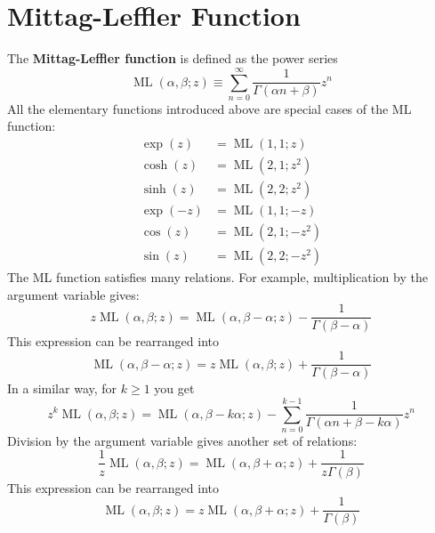 \section{Mittag-Leffler Function}
The \textbf{Mittag-Leffler function} is defined as the power series
\begin{equation}
	\operatorname{ML}(\alpha, \beta; z) \equiv \sum_{n = 0}^{\infty} \frac{1}{\Gamma(\alpha n + \beta)} z^{n}
\end{equation}
All the elementary functions introduced above are special cases of the ML function:
\begin{align}
	\exp(z)  & = \operatorname{ML}(1, 1; z)                 \\
	\cosh(z) & = \operatorname{ML}\left(2, 1; z^{2}\right)  \\
	\sinh(z) & = \operatorname{ML}\left(2, 2; z^{2}\right)  \\
	\exp(-z) & = \operatorname{ML}(1, 1; -z)                \\
	\cos(z)  & = \operatorname{ML}\left(2, 1; -z^{2}\right) \\
	\sin(z)  & = \operatorname{ML}\left(2, 2; -z^{2}\right)
\end{align}
The ML function satisfies many relations. For example, multiplication by the argument variable gives:
\begin{equation}
	z \operatorname{ML}(\alpha, \beta; z) = \operatorname{ML}(\alpha, \beta - \alpha; z) - \frac{1}{\Gamma(\beta - \alpha)}
\end{equation}
This expression can be rearranged into
\begin{equation}
	\operatorname{ML}(\alpha, \beta - \alpha; z) = z \operatorname{ML}(\alpha, \beta; z) + \frac{1}{\Gamma(\beta - \alpha)}
\end{equation}
In a similar way, for $k \geq 1$ you get
\begin{equation}
	z^{k} \operatorname{ML}(\alpha, \beta; z) = \operatorname{ML}(\alpha, \beta - k\alpha; z) - \sum_{n = 0}^{k-1} \frac{1}{\Gamma(\alpha n + \beta - k \alpha)} z^{n}
\end{equation}
Division by the argument variable gives another set of relations:
\begin{equation}
	\frac{1}{z} \operatorname{ML}(\alpha, \beta; z) = \operatorname{ML}(\alpha, \beta + \alpha; z) + \frac{1}{z \Gamma(\beta)}
\end{equation}
This expression can be rearranged into
\begin{equation}
	\operatorname{ML}(\alpha, \beta; z) = z \operatorname{ML}(\alpha, \beta + \alpha; z) + \frac{1}{\Gamma(\beta)}
\end{equation}
